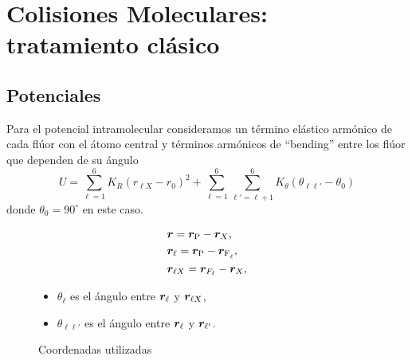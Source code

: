 \chapter{Colisiones Moleculares: tratamiento cl\'{a}sico}
\label{C:colis-molec}


\section{Potenciales}
\label{S:potenciales}

Para el potencial intramolecular consideramos un t\'{e}rmino el\'{a}stico arm\'{o}nico de cada fl\'{u}or con el \'{a}tomo central y t\'{e}rminos arm\'{o}nicos de ``bending'' entre los fl\'{u}or que dependen de su \'{a}ngulo
\begin{equation}\label{Q:pot-intra-energy}
  U = \sum_{\ell=1}^{6} K_{R} (r_{\ell X} - r_{0})^{2} + \sum_{\ell=1}^{6} \sum_{\ell'=\ell + 1}^{6} K_{\theta} (\theta_{\ell \ell'} - \theta_{0})
\end{equation}
%
donde $\theta_{0}=90^{\circ}$  en este caso.
  \begin{figure}[htbp]
\begin{minipage}{0.5\textwidth}
    \centering \resizebox{.8\linewidth}{!}{}
    \caption{Coordenadas utilizadas}
\end{minipage}\hfill
\begin{minipage}{0.4\textwidth}
  \begin{subequations}
    \begin{align}
      &\vect{r}=  \vect{r}_{\ce{P}} - \vect{r}_{X} , \\
      &\vect{r}_{\ell}=  \vect{r}_{\ce{P}} - \vect{r}_{\ce{F_{\ell}}} , \\
      &\vect{r}_{\ell X}= \vect{r}_{F_{\ell}} - \vect{r}_{X} ,
    \end{align}
  \end{subequations}
  \begin{itemize}
  \item $\theta_{\ell}$ es el \'{a}ngulo entre $\bm{r}_{\ell}$ y $\bm{r}_{\ell X}$,
  \item $\theta_{\ell \ell'}$ es el \'{a}ngulo entre $\bm{r}_{\ell}$ y $\bm{r}_{\ell'}$.
  \end{itemize}
\end{minipage}
\end{figure}

